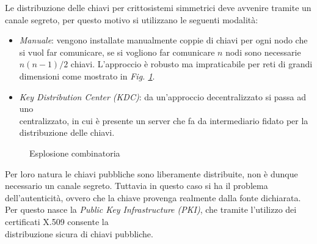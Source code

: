 \noindent
Le distribuzione delle chiavi per crittosistemi simmetrici deve avvenire tramite un canale segreto, per questo motivo si utilizzano le seguenti modalità:
\begin{itemize}
    \item \textit{Manuale}: vengono installate manualmente coppie di chiavi per ogni nodo che si vuol far comunicare, se si vogliono far comunicare $n$ nodi 
    sono necessarie $n(n-1)/2$ chiavi. L'approccio è robusto ma impraticabile per reti di grandi dimensioni come mostrato in \textit{Fig. \ref{fig:chiavi-simmetriche}}.
    \item \textit{Key Distribution Center (KDC)}: da un'approccio decentralizzato si passa ad uno \\centralizzato, in cui è presente un server che fa da intermediario
    fidato per la distribuzione delle chiavi.
\end{itemize}

\begin{figure}[h!]
    \centering
    \caption{Esplosione combinatoria}
    \label{fig:chiavi-simmetriche}
\end{figure}
\noindent
Per loro natura le chiavi pubbliche sono liberamente distribuite, non è dunque \\necessario un canale segreto. 
Tuttavia in questo caso si ha il problema dell'autenticità, ovvero che la chiave provenga realmente dalla fonte dichiarata. 
Per questo nasce la \textit{Public Key Infrastructure (PKI)}, che tramite l'utilizzo dei certificati X.509 consente la\\ distribuzione sicura di chiavi pubbliche.

